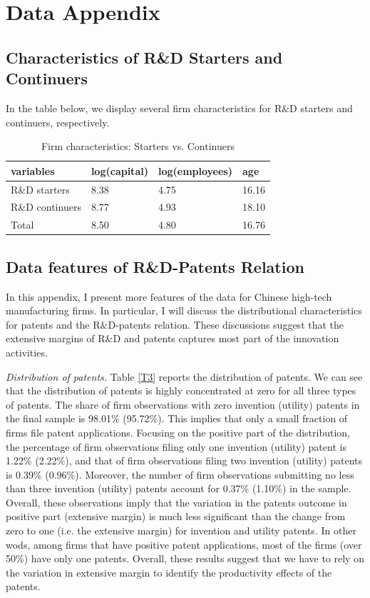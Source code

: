 \documentclass[11pt]{article}
\begin{document}
\section{Data Appendix}
\subsection{Characteristics of R\&D Starters and Continuers}
In the table below, we display several firm characteristics for R\&D starters and continuers, respectively. 
\begin{table}[h]
    \centering 
    \caption{Firm characteristics: Starters vs. Continuers}
\label{T_add}
    \begin{tabular}{llll}
    \toprule
    variables       & log(capital) & log(employees) & age   \\
    \midrule
    R\&D starters   & 8.38         & 4.75           & 16.16 \\
    R\&D continuers & 8.77         & 4.93           & 18.10 \\
    \midrule 
    Total           & 8.50         & 4.80           & 16.76  \\
    \bottomrule
   \end{tabular}
\end{table}


\subsection{Data features of R\&D-Patents Relation} \label{app_data_features}
In this appendix, I present more features of the
data for Chinese high-tech manufacturing firms. In particular, I will discuss the distributional characteristics for patents and the R\&D-patents relation. These discussions suggest that the extensive margins of R\&D and patents captures most part of the innovation activities. 

\textit{Distribution of patents.} Table \ref{T3} reports the distribution of patents. We can see that
the distribution of patents is highly concentrated at zero for all
three types of patents. The share of firm observations
with zero invention (utility) patents in the final sample is 98.01\%
(95.72\%). This implies that only a small fraction of firms file
patent applications. Focusing on the positive part of the distribution,
the percentage of firm observations filing only one invention (utility)
patent is 1.22\% (2.22\%), and that of firm observations filing two
invention (utility) patents is 0.39\% (0.96\%). Moreover, the number
of firm observations submitting no less than three invention (utility)
patents account for 0.37\% (1.10\%) in the sample. Overall,
these observations imply that the variation in the patents outcome
in positive part (extensive margin) is much less significant than
the change from zero to one (i.e. the extensive margin) for invention
and utility patents. In other wods, among firms that have positive
patent applications, most of the firms (over 50\%) have only one patents. Overall, these results suggest that we have to rely on the variation in extensive margin to identify the productivity effects of the patents.
\end{document}
